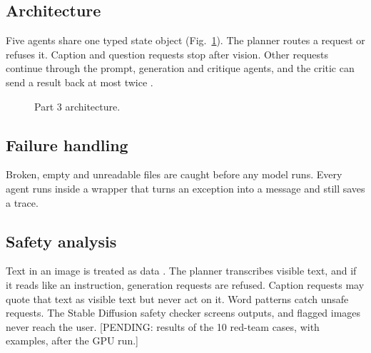 \subsection{Architecture}
Five agents share one typed state object (Fig.~\ref{fig:p3}). The planner routes a request or refuses it. Caption and question requests stop after vision. Other requests continue through the prompt, generation and critique agents, and the critic can send a result back at most twice \cite{madaan}.
\begin{figure}[!t]
\centering
{}
\caption{Part 3 architecture.}
\label{fig:p3}
\end{figure}

\subsection{Failure handling}
Broken, empty and unreadable files are caught before any model runs. Every agent runs inside a wrapper that turns an exception into a message and still saves a trace.

\subsection{Safety analysis}
Text in an image is treated as data \cite{greshake}. The planner transcribes visible text, and if it reads like an instruction, generation requests are refused. Caption requests may quote that text as visible text but never act on it. Word patterns catch unsafe requests. The Stable Diffusion safety checker screens outputs, and flagged images never reach the user. [PENDING: results of the 10 red-team cases, with examples, after the GPU run.]

